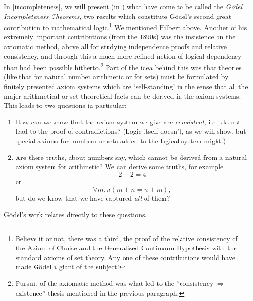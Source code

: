 In \cref{incompleteness}, we will present (in
) what have come to be called the
\emph{G\"odel Incompleteness Theorems}, two results which constitute
G\"odel's second great contribution to mathematical
logic.\footnote{Believe it or not, there was a third, the proof of the
relative consistency of the Axiom of Choice and the Generalised
Continuum Hypothesis with the standard axioms of set theory. Any one
of these contributions would have made G\"odel a giant of the
subject!{}} We mentioned Hilbert above. Another of his extremely
important contributions (from the 1890s) was the insistence on the
axiomatic method, above all for studying independence proofs and
relative consistency, and through this a much more refined notion of
logical dependency than had been possible hitherto.\footnote{Pursuit
of the axiomatic method was what led to the ``consistency
$\Rightarrow$ existence'' thesis mentioned in the previous paragraph.}
Part of the idea behind this was  that theories (like that for natural
number arithmetic or for sets) must be formulated by finitely
presented axiom systems which are `self-standing' in the sense that
all the major arithmetical or set-theoretical facts can be derived in
the axiom systems. This leads to two questions in particular:
\begin{enumerate}
  \item How can we show that the axiom system we give are
  \emph{consistent}, i.e., do not lead to the proof of contradictions?
  (Logic itself doesn't, as we will show, but special axioms for
  numbers or sets added to the logical system might.)
  \item Are there truths, about numbers say, which cannot be derived
  from a natural axiom system for arithmetic? We can derive some
  truths, for example \[2+2=4\] or \[\forall m, n (m+n=n+m),\]  but
  do  we know that we have captured \emph{all} of them?
\end{enumerate}
G\"odel's work relates directly to these questions. 

